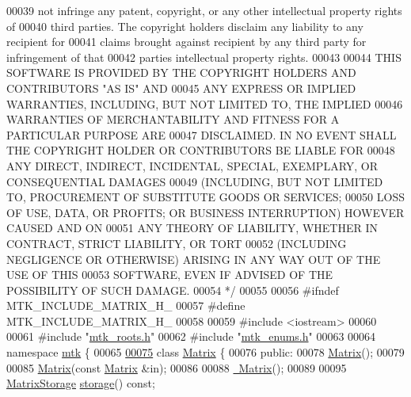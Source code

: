 \begin{DoxyCode}
00039 \textcolor{comment}{not infringe any patent, copyright, or any other intellectual property rights of}
00040 \textcolor{comment}{third parties. The copyright holders disclaim any liability to any recipient for}
00041 \textcolor{comment}{claims brought against recipient by any third party for infringement of that}
00042 \textcolor{comment}{parties intellectual property rights.}
00043 \textcolor{comment}{}
00044 \textcolor{comment}{THIS SOFTWARE IS PROVIDED BY THE COPYRIGHT HOLDERS AND CONTRIBUTORS "AS IS" AND}
00045 \textcolor{comment}{ANY EXPRESS OR IMPLIED WARRANTIES, INCLUDING, BUT NOT LIMITED TO, THE IMPLIED}
00046 \textcolor{comment}{WARRANTIES OF MERCHANTABILITY AND FITNESS FOR A PARTICULAR PURPOSE ARE}
00047 \textcolor{comment}{DISCLAIMED. IN NO EVENT SHALL THE COPYRIGHT HOLDER OR CONTRIBUTORS BE LIABLE FOR}
00048 \textcolor{comment}{ANY DIRECT, INDIRECT, INCIDENTAL, SPECIAL, EXEMPLARY, OR CONSEQUENTIAL DAMAGES}
00049 \textcolor{comment}{(INCLUDING, BUT NOT LIMITED TO, PROCUREMENT OF SUBSTITUTE GOODS OR SERVICES;}
00050 \textcolor{comment}{LOSS OF USE, DATA, OR PROFITS; OR BUSINESS INTERRUPTION) HOWEVER CAUSED AND ON}
00051 \textcolor{comment}{ANY THEORY OF LIABILITY, WHETHER IN CONTRACT, STRICT LIABILITY, OR TORT}
00052 \textcolor{comment}{(INCLUDING NEGLIGENCE OR OTHERWISE) ARISING IN ANY WAY OUT OF THE USE OF THIS}
00053 \textcolor{comment}{SOFTWARE, EVEN IF ADVISED OF THE POSSIBILITY OF SUCH DAMAGE.}
00054 \textcolor{comment}{*/}
00055 
00056 \textcolor{preprocessor}{#ifndef MTK\_INCLUDE\_MATRIX\_H\_}
00057 \textcolor{preprocessor}{#define MTK\_INCLUDE\_MATRIX\_H\_}
00058 
00059 \textcolor{preprocessor}{#include <iostream>}
00060 
00061 \textcolor{preprocessor}{#include "\hyperlink{mtk__roots_8h}{mtk\_roots.h}"}
00062 \textcolor{preprocessor}{#include "\hyperlink{mtk__enums_8h}{mtk\_enums.h}"}
00063 
00064 \textcolor{keyword}{namespace }\hyperlink{namespacemtk}{mtk} \{
00065 
\hypertarget{mtk__matrix_8h_source_l00075}{}\hyperlink{classmtk_1_1Matrix}{00075} \textcolor{keyword}{class }\hyperlink{classmtk_1_1Matrix}{Matrix} \{
00076  \textcolor{keyword}{public}:
00078   \hyperlink{classmtk_1_1Matrix_a04b8575764d3a649f21950c794f4cc02}{Matrix}();
00079 
00085   \hyperlink{classmtk_1_1Matrix_a04b8575764d3a649f21950c794f4cc02}{Matrix}(\textcolor{keyword}{const} \hyperlink{classmtk_1_1Matrix}{Matrix} &in);
00086 
00088   \hyperlink{classmtk_1_1Matrix_a7dcc92fcf67904eaf17bb7b9d809f274}{~Matrix}();
00089 
00095   \hyperlink{group__c02-enums_ga25b67ec6a2afeee69f9bb196a9c66619}{MatrixStorage} \hyperlink{classmtk_1_1Matrix_a21893fc643eebadd9757c8995cf44dd3}{storage}() \textcolor{keyword}{const};

\end{DoxyCode}

